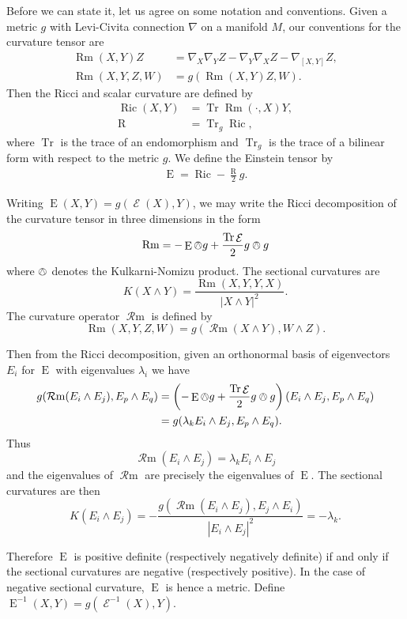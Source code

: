 \documentclass{cambridge7a}
\renewcommand{\~}{\tilde}
\renewcommand{\-}{\bar}
\newcommand{\8}{\infty}
\newcommand{\abs}[1]{\left\lvert{#1}\right\rvert}
\DeclareMathOperator{\Tr}{Tr}
\DeclareMathOperator{\Ric}{Ric}
\DeclareMathOperator{\Rm}{Rm}
\DeclareMathOperator{\opRm}{\mathcal{R}m}
\DeclareMathOperator{\Sc}{R}
\DeclareMathOperator{\Ein}{E}
\DeclareMathOperator{\opEin}{\mathcal{E}}
\newcommand{\eq}[1]{\begin{equation}\begin{alignedat}{2} #1 \end{alignedat}\end{equation}}
\begin{document}
Before we can state it, let us agree on some notation and conventions. Given a metric \(g\) with Levi-Civita connection $\nabla$ on a manifold $M$, our conventions for the curvature tensor are
\[
\begin{split}
\Rm(X, Y) Z &= \nabla_X \nabla_Y Z - \nabla_Y \nabla_X Z - \nabla_{[X, Y]} Z, \\
\Rm(X, Y, Z, W) &= g(\Rm(X, Y) Z, W).
\end{split}
\]
Then the Ricci and scalar curvature are defined by
\eq{
\Ric(X, Y)&= \Tr \Rm(\cdot, X) Y,\\
		\Sc &=\Tr_{g}\Ric,
}
where $\Tr$ is the trace of an endomorphism and $\Tr_{g}$ is the trace of a bilinear form with respect to the metric $g$. We define the Einstein tensor by
\eq{\Ein=\Ric-\frac{\Sc}{2}g.}

Writing \(\Ein(X, Y) = g(\opEin(X), Y)\), we may write the Ricci decomposition of the curvature tensor in three dimensions in the form
\begin{equation}
\label{eq:ricci_decomp}
\Rm = -\Ein \owedge g + \frac{\Tr \opEin}{2} g \owedge g
\end{equation}
where \(\owedge\) denotes the Kulkarni-Nomizu product. The sectional curvatures are
\[
K(X \wedge Y) = \frac{\Rm(X, Y, Y, X)}{\abs{X \wedge Y}^2}.
\]
The curvature operator \(\opRm\) is defined by
\[
\Rm(X, Y, Z, W) = g(\opRm(X \wedge Y), W \wedge Z).
\]

Then from the Ricci decomposition, given an orthonormal basis of eigenvectors \(E_i\) for \(\Ein\) with eigenvalues \(\lambda_i\) we have
\[
\begin{split}
g(\opRm(E_i \wedge E_j), E_p \wedge E_q) &= \left(-\Ein \owedge g + \frac{\Tr \opEin}{2} g \owedge g\right) (E_i \wedge E_j, E_p \wedge E_q) \\
&= g(\lambda_k E_i \wedge E_j, E_p \wedge E_q).
\end{split}
\]
Thus
\[
\opRm(E_i \wedge E_j) = \lambda_k E_i \wedge E_j
\]
and the eigenvalues of \(\opRm\) are precisely the eigenvalues of \(\Ein\). The sectional curvatures are then
\begin{equation}
\label{eq:sectional}
K (E_i \wedge E_j) = -\frac{g(\opRm(E_i \wedge E_j), E_j \wedge E_i)}{\abs{E_i \wedge E_j}^2} = -\lambda_k.
\end{equation}

Therefore \(\Ein\) is positive definite (respectively negatively definite) if and only if the sectional curvatures are negative (respectively positive). In the case of negative sectional curvature, \(\Ein\) is hence a metric. Define \(\Ein^{-1}(X, Y) = g(\opEin^{-1} (X), Y)\).
\end{document}
